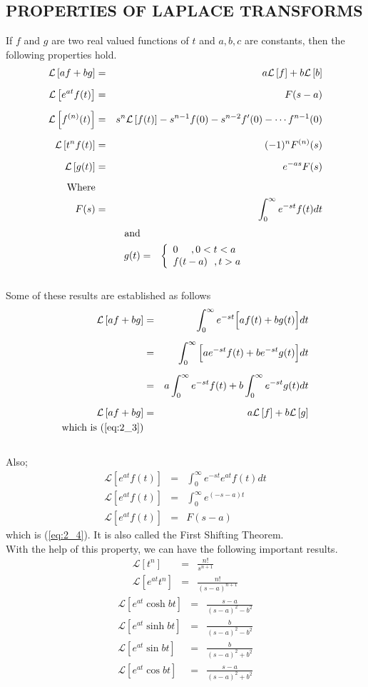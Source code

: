\documentclass[11pt]{report}
\newcommand{\Laplace}{\mathcal{L}}
\newcommand{\ft}{f(t)}
\newcommand{\ftp}[1]{f^{#1}(t)}
\newcommand{\Fs}{F(s)}
\newcommand{\sbracket}[1]{\left[#1\right]}
\newcommand{\LFt}{\Laplace \sbracket{\ft}}
\newcommand{\LFn}[1]{\Laplace \sbracket{#1}}
\newcommand{\sps}{\\[0.2cm]}
\newcommand{\refn}[1]{(\ref{#1})}
\newcommand{\refx}[1]{\refn{eq:#1}}
\newcommand{\sprime}{'}
\begin{document}
	\subsection{PROPERTIES OF LAPLACE TRANSFORMS}
	If $f$ and $g$ are two real valued functions of $t$ and $a,b,c$ are constants, then the following properties hold.
	\begin{eqnarray}
		\LFn{af + bg} &=& a\LFn{f} + b\LFn{b}\label{eq:2_3}\sps
		\LFn{e^{at}\ft} &=& F(s-a)\label{eq:2_4}\sps
		\LFn{\ftp{(n)}} &=& s^n\LFt - s^{n-1}f(0) - s^{n-2}f\sprime(0) - \cdots f^{n-1}(0)\label{eq:2_5}\sps
		\LFn{t^n\ft} &=& (-1)^{n}F^{(n)}(s)\sps
		\LFn{g(t)} &=& e^{-as}\Fs\sps
		\text{Where}\notag\\
		\Fs &=& \int_0^\infty e^{-st}\ft dt\notag
	\end{eqnarray}
	\begin{eqnarray}
		\text{and}\notag\\
		g(t) &=& \left\{\begin{array}{l}
			0~~~~, 0 < t < a\\
			f(t-a)~~, t > a
		\end{array}\right.\notag
	\end{eqnarray}\\
	Some of these results are established as follows
	\begin{eqnarray*}
		\LFn{af + bg} &=& \int_0^\infty e^{-st}\Big[a\ft + bg(t)\Big]dt\sps
		&=& \int_0^\infty\Big[ae^{-st}\ft + be^{-st}g(t)\Big]dt\sps
		&=& a\int_0^\infty e^{-st}f(t) + b\int_0^\infty e^{-st}g(t)dt\sps
		\LFn{af + bg} &=& a \LFn{f} + b\LFn{g}\\
		\text{which is \refx{2_3}}
	\end{eqnarray*}
	\\Also;
	\begin{eqnarray*}
		\LFn{e^{at}\ft} &=&\int_0^\infty e^{-st}e^{at}\ft dt\sps
		\LFn{e^{at}\ft} &=& \int_0^\infty e^{(-s-a)t}\\
		\LFn{e^{at}\ft} &=& F(s-a)
	\end{eqnarray*}
	which is \refx{2_4}. It is also called the First Shifting Theorem.\sps
	With the help of this property, we can have the following important results.
	\begin{eqnarray}
		\LFn{t^n} &=& \frac{n!}{s^{n+1}}\sps
		\LFn{e^{at}t^n} &=& \frac{n!}{(s-a)^{n+1}}
	\end{eqnarray}
	\begin{eqnarray}
		\LFn{e^{at}\cosh bt} &=&\frac{s-a}{(s-a)^2-b^2}\sps
		\LFn{e^{at}\sinh bt} &=& \frac{b}{(s-a)^2-b^2}\sps
		\LFn{e^{at}\sin bt} &=& \frac{b}{(s-a)^2+b^2}\sps
		\LFn{e^{at}\cos bt} &=& \frac{s-a}{(s-a)^2 + b^2}
	\end{eqnarray}
\end{document}
